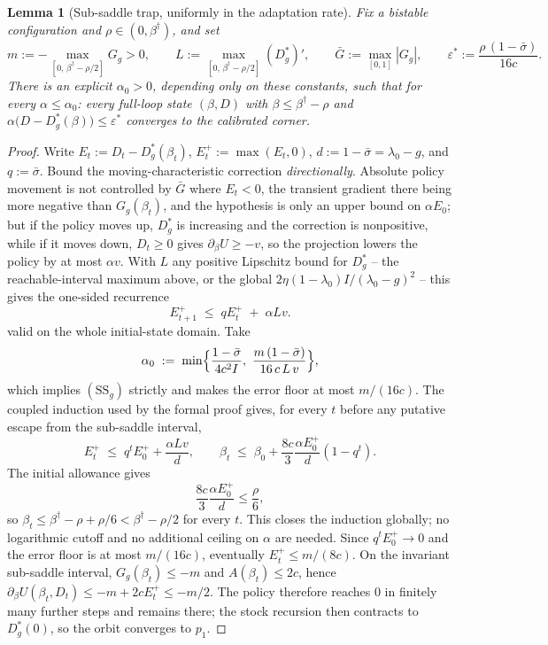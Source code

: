 \documentclass[11pt]{article}
\newtheorem{lemma}[theorem]{Lemma}
\theoremstyle{definition}
\theoremstyle{remark}
\numberwithin{equation}{section}
\begin{document}
\begin{lemma}[Sub-saddle trap, uniformly in the adaptation rate]\label{lem:trap}
Fix a bistable configuration and $\rho \in (0, \beta^\dagger)$, and set
\[
m := -\max_{[0,\,\beta^\dagger-\rho/2]} G_g > 0,
\qquad
L := \max_{[0,\,\beta^\dagger-\rho/2]} (D^\ast_g)',
\qquad
\bar G := \max_{[0,1]} |G_g|,
\qquad
\varepsilon^\ast := \frac{\rho\,(1-\bar\sigma)}{16c}.
\]
There is an explicit $\alpha_0 > 0$, depending only on these constants, such that for every $\alpha \le \alpha_0$: every full-loop state $(\beta, D)$ with $\beta \le \beta^\dagger - \rho$ and $\alpha\bigl(D - D^\ast_g(\beta)\bigr) \le \varepsilon^\ast$ converges to the calibrated corner.
\end{lemma}
\begin{proof}
Write $E_t := D_t - D^\ast_g(\beta_t)$, $E_t^+ := \max(E_t,0)$, $d:=1-\bar\sigma=\lambda_0-g$, and $q:=\bar\sigma$. Bound the moving-characteristic correction \emph{directionally}. Absolute policy movement is not controlled by $\bar G$ where $E_t < 0$, the transient gradient there being more negative than $G_g(\beta_t)$, and the hypothesis is only an upper bound on $\alpha E_0$; but if the policy moves up, $D^\ast_g$ is increasing and the correction is nonpositive, while if it moves down, $D_t \ge 0$ gives $\partial_\beta U \ge -v$, so the projection lowers the policy by at most $\alpha v$. With $L$ any positive Lipschitz bound for $D^\ast_g$ -- the reachable-interval maximum above, or the global $2\eta(1-\lambda_0)I/(\lambda_0-g)^2$ -- this gives the one-sided recurrence
\[
E_{t+1}^+ \;\le\; qE_t^+ \;+\; \alpha L v .
\]
valid on the whole initial-state domain. Take
\[
\alpha_0 \;:=\; \min\Bigl\{\frac{1-\bar\sigma}{4c^2I},\ \frac{m\,(1-\bar\sigma)}{16\,c\,L\,v}\Bigr\},
\]
which implies $(\mathrm{SS}_g)$ strictly and makes the error floor at most $m/(16c)$. The coupled induction used by the formal proof gives, for every $t$ before any putative escape from the sub-saddle interval,
\[
E_t^+ \;\le\; q^tE_0^+ + \frac{\alpha Lv}{d},
\qquad
\beta_t \;\le\; \beta_0+
\frac{8c}{3}\frac{\alpha E_0^+}{d}(1-q^t).
\]
The initial allowance gives
\[
\frac{8c}{3}\frac{\alpha E_0^+}{d}\le\frac{\rho}{6},
\]
so $\beta_t\le\beta^\dagger-\rho+\rho/6<\beta^\dagger-\rho/2$ for every $t$. This closes the induction globally; no logarithmic cutoff and no additional ceiling on $\alpha$ are needed. Since $q^tE_0^+\to0$ and the error floor is at most $m/(16c)$, eventually $E_t^+\le m/(8c)$. On the invariant sub-saddle interval,
$G_g(\beta_t)\le-m$ and $A(\beta_t)\le2c$, hence
$\partial_\beta U(\beta_t,D_t)\le-m+2cE_t^+\le-m/2$.
The policy therefore reaches $0$ in finitely many further steps and remains there; the stock recursion then contracts to $D^\ast_g(0)$, so the orbit converges to $p_1$.
\end{proof}
\end{document}
